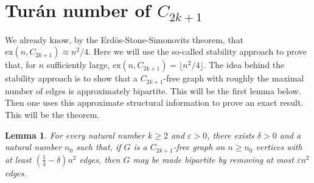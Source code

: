 \documentclass[12pt]{article}
\newtheorem{lemma}{Lemma}
\newcommand{\ex}{\mathrm{ex}}
\begin{document}
\section{Tur\'an number of $C_{2k+1}$}
We already know, by the Erd\"os-Stone-Simonovits theorem, that $\ex(n, C_{2k+1})\approx n^2/4$. Here we will use the so-called stability approach to prove that, for $n$ sufficiently large, $\ex(n, C_{2k+1}) = \lfloor n^2/4 \rfloor$. The idea behind the stability approach is to show that a $C_{2k+1}$-free graph with roughly the maximal number of edges is approximately bipartite. This will be the first lemma below. Then one uses this approximate structural information to prove an exact result. This will be the theorem.

\begin{lemma}
	For every natural number $k \geq 2$ and $\varepsilon>0$, there exists $\delta>0$ and a natural number $n_0$ such that, if $G$ is a $C_{2k+1}$-free graph on $n \geq n_0$ vertices with at least $(\frac{1}{4}-\delta)n^2$ edges, then $G$ may be made bipartite by removing at most $\varepsilon n^2$ edges.
\end{lemma}
\end{document}
